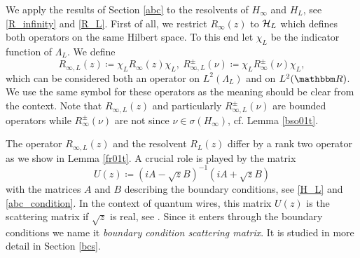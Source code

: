 We apply the results of Section \ref{abc} to the resolvents of $H_\infty$
and $H_L$, see \eqref{R_infinity} and \eqref{R_L}. First of all, we restrict $R_\infty(z)$ to ${\mathcal H}_L$
which defines both operators on the same Hilbert space.
To this end let $\chi_L$ be the indicator function of $\Lambda_L$. We define
\begin{equation}\label{R_infinity_L}
  R_{\infty,L}(z) \coloneqq \chi_L R_\infty(z)\chi_L,\ R_{\infty,L}^\pm (\nu) \coloneqq \chi_L R_\infty^\pm(\nu)\chi_L ,
\end{equation}
which can be considered both an operator on $L^2(\Lambda_L)$ and on $L^2(\R)$. We use
the same symbol for these operators as the meaning should be clear from the context.
Note that $R_{\infty,L}(z)$ and particularly $R_{\infty,L}^\pm(\nu)$ are bounded operators 
while $R_\infty^\pm(\nu)$ are not since $\nu\in\sigma(H_\infty)$, cf. Lemma \ref{bso01t}.

The operator $R_{\infty,L}(z)$ and the resolvent $R_L(z)$ differ by a rank two operator as we show in Lemma \ref{fr01t}. 
A crucial role is played by the matrix
\begin{equation}\label{fr_bcs}
  U(z) \coloneqq (iA-\sqrt{z}B)^{-1}(iA+\sqrt{z}B)
\end{equation}
with the matrices $A$ and $B$ describing the boundary conditions, see \eqref{H_L} and \eqref{abc_condition}.
In the context of quantum wires, this matrix $U(z)$ is the scattering matrix if $\sqrt{z}$ is real, see \cite[Thm. 2.1]{KostrykinSchrader1999}. 
Since it enters through the boundary conditions we name it \emph{boundary condition scattering matrix}. 
It is studied in more detail in Section \ref{bcs}.


